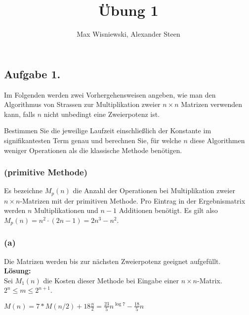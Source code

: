 \documentclass[11pt,a4paper,ngerman]{article}
\date{}
\title{Übung 1}
\author{Max Wisniewski, Alexander Steen}
\begin{document}

\renewcommand{\figurename}{Figure}

\maketitle
\thispagestyle{fancy}

\subsection*{Aufgabe 1.}

Im Folgenden werden zwei Vorhergehensweisen angeben, wie man den Algorithmus
von Strassen zur Multiplikation zweier $n \times n$ Matrizen verwenden kann, falls
$n$ nicht unbedingt eine Zweierpotenz ist.

Bestimmen Sie die jeweilige Laufzeit einschließlich der Konstante im signifikantesten
Term genau und berechnen Sie, für welche $n$ diese Algorithmen weniger Operationen als
die klassische Methode benötigen.

\subsubsection*{(primitive Methode)}
Es bezeichne $M_p(n)$ die Anzahl der Operationen bei Multiplikation zweier $n \times n$-Matrizen
mit der primitiven Methode. Pro Eintrag in der Ergebnismatrix werden $n$ Multiplikationen
und $n-1$ Additionen benötigt. Es gilt also $M_p(n) = n^2 \cdot (2n-1) = 2n^3-n^2$.

\subsubsection*{(a)}

Die Matrizen werden bis zur nächsten Zweierpotenz geeignet aufgefüllt.\\

\textbf{Lösung:}\\
Sei $M_1(n)$ die Kosten dieser Methode bei Eingabe einer $n \times n$-Matrix.
 $2^n \leq m \leq 2^{n+1}$.


$M(n) = 7*M(n/2) + 18 \frac{n}{2} = \frac{23}{5}n^{\log 7} - \frac{18}{5}n$
\end{document}
